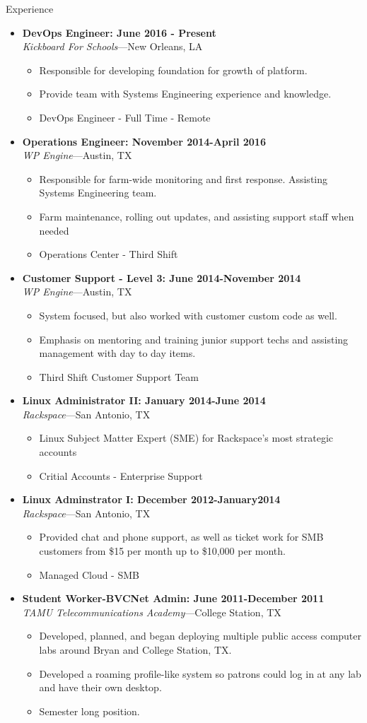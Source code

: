 \documentclass[10pt,oneside]{article}
\newenvironment{ressection}[1]{
    \vspace{4pt}
    {\fontfamily{phv}\selectfont\Large#1}
    \begin{itemize}
    \vspace{3pt}
}{
    \end{itemize}
}
\newcommand{\ressubitem}[1]{
    \vspace{-1pt}
    \item \begin{flushleft} #1 \end{flushleft}
}
\newcommand{\resbigitem}[3]{
    \vspace{-5pt}
    \item
    \textbf{#3} \\
    \textit{#1}---#2
}
\newenvironment{ressubsec}[3]{
    \resbigitem{#1}{#2}{#3}
    \vspace{-2pt}
    \begin{itemize}
}{
    \end{itemize}
}
\begin{document}
\begin{ressection}{Experience}

    \begin{ressubsec}{Kickboard For Schools}{New Orleans, LA}{DevOps Engineer: June 2016 - Present}
        \ressubitem{Responsible for developing foundation for growth of platform.}
        \ressubitem{Provide team with Systems Engineering experience and knowledge.}
        \ressubitem{DevOps Engineer - Full Time - Remote}
    \end{ressubsec}

    \begin{ressubsec}{WP Engine}{Austin, TX}{Operations Engineer: November 2014-April 2016}
        \ressubitem{Responsible for farm-wide monitoring and first response.  Assisting Systems Engineering team.}
        \ressubitem{Farm maintenance, rolling out updates, and assisting support staff when needed}
        \ressubitem{Operations Center - Third Shift}
    \end{ressubsec}

    \begin{ressubsec}{WP Engine}{Austin, TX}{Customer Support - Level 3: June 2014-November 2014}
        \ressubitem{System focused, but also worked with customer custom code as well.}
        \ressubitem{Emphasis on mentoring and training junior support techs and assisting management with day to day items.}
        \ressubitem{Third Shift Customer Support Team}
    \end{ressubsec}

    \begin{ressubsec}{Rackspace}{San Antonio, TX}{Linux Administrator II: January 2014-June 2014}
        \ressubitem{Linux Subject Matter Expert (SME) for Rackspace's most strategic accounts}
        \ressubitem{Critial Accounts - Enterprise Support}
    \end{ressubsec}

    \begin{ressubsec}{Rackspace}{San Antonio, TX}{Linux Adminstrator I: December 2012-January2014}
        \ressubitem{Provided chat and phone support, as well as ticket work for SMB customers from \$15 per month up to \$10,000 per month.}
        \ressubitem{Managed Cloud - SMB}
    \end{ressubsec}
    \begin{ressubsec}{TAMU Telecommunications Academy}{College Station, TX}{Student Worker-BVCNet Admin: June 2011-December 2011}
        \ressubitem{Developed, planned, and began deploying multiple public access computer labs around Bryan and College Station, TX.}
        \ressubitem{Developed a roaming profile-like system so patrons could log in at any lab and have their own desktop.}
        \ressubitem{Semester long position.}
    \end{ressubsec}


\end{ressection}
\end{document}
